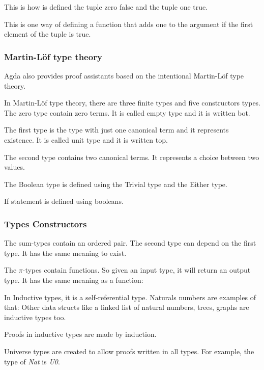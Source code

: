   This is how is defined the tuple zero false and the tuple one true.

  This is one way of defining a function that adds one to the argument
  if the first element of the tuple is true.


  \subsubsection{Martin-Löf type theory}
  Agda also provides proof assistants based on the intentional Martin-Löf type theory.

    In Martin-Löf type theory, there are three finite types and five constructors types.
    The zero type contain zero terms. It is called empty type and it is written bot.

    The first type is the type with just one canonical term and it represents existence.
    It is called unit type and it is written top.

    The second type contains two canonical terms. It represents a choice between two values.

    The Boolean type is defined using the Trivial type and the Either type.

    If statement is defined using booleans.


    \subsubsection{Types Constructors}
    The sum-types contain an ordered pair.
    The second type can depend on the first type.
    It has the same meaning to exist.

    The $\pi$-types contain functions.
    So given an input type, it will return an output type.
    It has the same meaning as a function:

    In Inductive types, it is a self-referential type.
    Naturals numbers are examples of that:
    Other data structs like a linked list of natural numbers, trees, graphs are inductive types too.

    Proofs in inductive types are made by induction.

    Universe types are created to allow proofs written in all types.
    For example, the type of \emph{Nat} is \emph{U0}.



